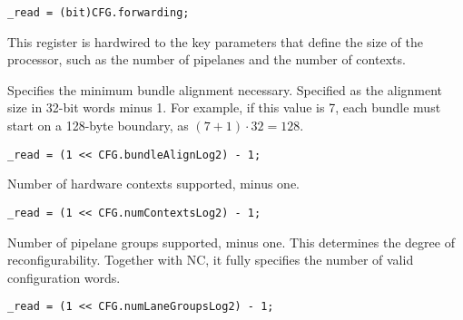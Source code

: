 \reset{*}
\implementation{}
\begin{lstlisting}
_read = (bit)CFG.forwarding;
\end{lstlisting}


This register is hardwired to the key parameters that define the size of the
processor, such as the number of pipelanes and the number of contexts.

Specifies the minimum bundle alignment necessary. Specified as the alignment
size in 32-bit words minus 1. For example, if this value is 7, each bundle must
start on a 128-byte boundary, as $(7 + 1) \cdot 32 = 128$.

\reset{****}
\implementation{}
\begin{lstlisting}
_read = (1 << CFG.bundleAlignLog2) - 1;
\end{lstlisting}

Number of hardware contexts supported, minus one.

\reset{****}
\implementation{}
\begin{lstlisting}
_read = (1 << CFG.numContextsLog2) - 1;
\end{lstlisting}

Number of pipelane groups supported, minus one. This determines the degree of
reconfigurability. Together with NC, it fully specifies the number of valid
configuration words.

\reset{****}
\implementation{}
\begin{lstlisting}
_read = (1 << CFG.numLaneGroupsLog2) - 1;
\end{lstlisting}

